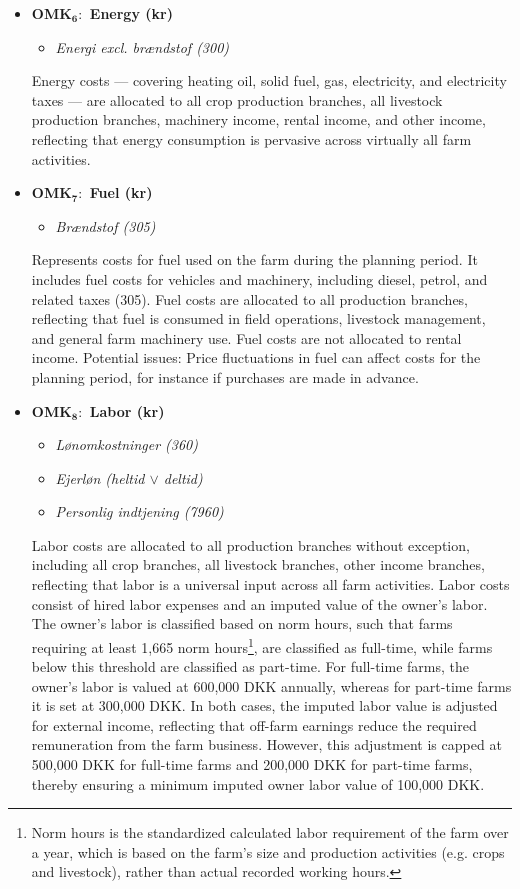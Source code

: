 \documentclass[12pt]{article}
\begin{document}
\begin{itemize}
    \item[] \textbf{OMK$_\textbf{6}:$ Energy (kr)}
    \begin{itemize}
        \item[$+$] \textit{Energi excl. brændstof (300)}
    \end{itemize}
    Energy costs --- covering heating oil, solid fuel, gas, electricity, and electricity taxes --- are allocated to all crop production branches, all livestock production branches, machinery income, rental income, and other income, reflecting that energy consumption is pervasive across virtually all farm activities. 

    \item[] \textbf{OMK$_\textbf{7}:$ Fuel (kr)}
    \begin{itemize}
        \item[$+$] \textit{Brændstof (305)}
    \end{itemize}
    Represents costs for fuel used on the farm during the planning period. It includes fuel costs for vehicles and machinery, including diesel, petrol, and related taxes (305).
    Fuel costs are allocated to all production branches, reflecting that fuel is consumed in field operations, livestock management, and general farm machinery use. 
    Fuel costs are not allocated to rental income.
    Potential issues: Price fluctuations in fuel can affect costs for the planning period, for instance if purchases are made in advance.

    \item[] \textbf{OMK$_\textbf{8}:$ Labor (kr)}
       \begin{itemize}
        \item[$+$] \textit{Lønomkostninger (360)}
        \item[$+$] \textit{Ejerløn (heltid $\lor$ deltid)}
        \item[$-$] \textit{Personlig indtjening (7960)}
    \end{itemize}
    Labor costs are allocated to all production branches without exception, including all crop branches, all livestock branches, other income branches, reflecting that labor is a universal input across all farm activities.
    Labor costs consist of hired labor expenses and an imputed value of the owner’s labor. 
    The owner’s labor is classified based on norm hours, such that farms requiring at least 1,665 norm hours\footnote{Norm hours is the standardized calculated labor requirement of the farm over a year, which is based on the farm's size and production activities (e.g. crops and livestock), rather than actual recorded working hours.}, are classified as full-time, while farms below this threshold are classified as part-time. 
    For full-time farms, the owner’s labor is valued at 600,000 DKK annually, whereas for part-time farms it is set at 300,000 DKK. In both cases, the imputed labor value is adjusted for external income, reflecting that off-farm earnings reduce the required remuneration from the farm business. However, this adjustment is capped at 500,000 DKK for full-time farms and 200,000 DKK for part-time farms, thereby ensuring a minimum imputed owner labor value of 100,000 DKK.


\end{itemize}
\end{document}
